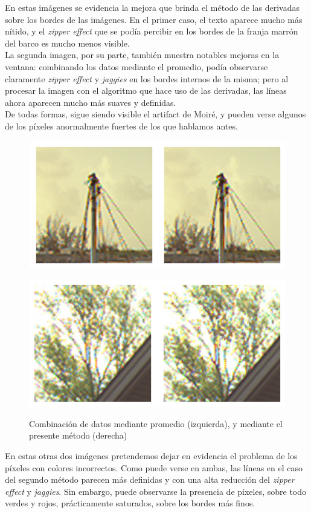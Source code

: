 \documentclass[a4paper]{article}
\begin{document}
En estas imágenes se evidencia la mejora que brinda el método de las derivadas sobre los bordes de las imágenes. En el primer caso, el texto aparece mucho más nítido, y el \textit{zipper effect} que se podía percibir en los bordes de la franja marrón del barco es mucho menos visible.\\
\indent La segunda imagen, por su parte, también muestra notables mejoras en la ventana: combinando los datos mediante el promedio, podía observarse claramente \textit{zipper effect} y \textit{jaggies} en los bordes internos de la misma; pero al procesar la imagen con el algoritmo que hace uso de las derivadas, las líneas ahora aparecen mucho más suaves y definidas. \\
De todas formas, sigue siendo visible el artifact de Moiré, y pueden verse algunos de los píxeles anormalmente fuertes de los que hablamos antes.

\begin{figure}[h!]
	\begin{center}
	    \includegraphics[scale=0.47]{imagenes/Splines/RecortesSplines/pesos1y0/barco1.png}\\
	\end{center}
	\begin{center}
	    \includegraphics[scale=0.47]{imagenes/Splines/RecortesSplines/pesos1y0/arbol.png}\\
	\end{center}
	\caption{Combinación de datos mediante promedio (izquierda), y mediante el presente método (derecha)}
	\label{splines3}
\end{figure}
\pagebreak
En estas otras dos imágenes pretendemos dejar en evidencia el problema de los píxeles con colores incorrectos. Como puede verse en ambas, las líneas en el caso del segundo método parecen más definidas y con una alta reducción del \textit{zipper effect} y \textit{jaggies}. Sin embargo, puede observarse la presencia de píxeles, sobre todo verdes y rojos, prácticamente saturados, sobre los bordes más finos. \\
\end{document}
